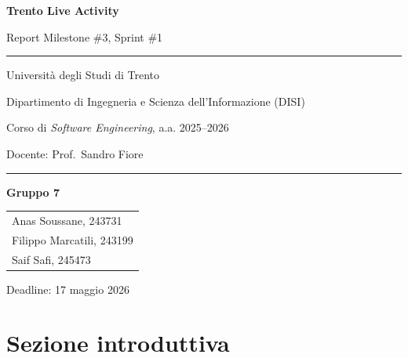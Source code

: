 \documentclass[11pt,a4paper]{article}
\begin{document}
  \begin{titlepage}
  \centering
  \vspace*{2cm}
  {\Huge\bfseries\color{accent} Trento Live Activity\par}
  \vspace{0.4cm}
  {\Large Report Milestone \#3, Sprint \#1\par}
  \vspace{1.5cm}
  \rule{0.6\textwidth}{0.4pt}\par
  \vspace{0.6cm}
  {\large Universit\`{a} degli Studi di Trento\par}
  {\large Dipartimento di Ingegneria e Scienza dell'Informazione (DISI)\par}
  {\large Corso di \emph{Software Engineering}, a.a. 2025--2026\par}
  \vspace{0.4cm}
  {\large Docente: Prof.\ Sandro Fiore\par}
  \vspace{1.5cm}
  \rule{0.6\textwidth}{0.4pt}\par
  \vspace{2cm}
  {\large\bfseries Gruppo 7\par}
  \vspace{0.3cm}
  \begin{tabular}{l}
  Anas Soussane, 243731 \\
  Filippo Marcatili, 243199 \\
  Saif Safi, 245473 \\
  \end{tabular}
  \vfill
  {\large Deadline: 17 maggio 2026\par}
  \end{titlepage}

  \tableofcontents
  \newpage

  \section{Sezione introduttiva}
\end{document}
